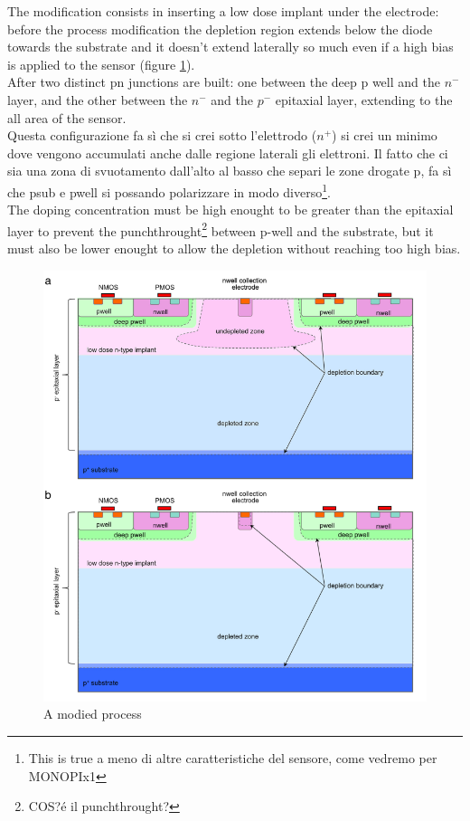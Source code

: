 The modification consists in inserting a low dose implant under the electrode: before the process modification the depletion region extends below the diode towards the substrate and it doesn't extend laterally so much even if a high bias is applied to the sensor (figure \ref{fig:modified_process}). \\
After two distinct pn junctions are built: one between the deep p well and the $n^-$ layer, and the other between the $n^-$ and the $p^-$ epitaxial layer, extending to the all area of the sensor.\\
Questa configurazione fa sì che si crei sotto l'elettrodo ($n^+$) si crei un minimo dove vengono 
accumulati anche dalle regione laterali gli elettroni. 
Il fatto che ci sia una zona di svuotamento dall'alto al basso che separi le zone drogate p, fa sì
che psub e pwell si possando polarizzare in modo diverso\footnote{This is true a meno di altre 
caratteristiche del sensore, come vedremo per MONOPIx1}.\\
The doping concentration must be high enought to be greater than the epitaxial layer to prevent the punchthrought\footnote{COS?é il punchthrought?} between p-well and the substrate, but it must also be lower enought to allow the depletion without reaching too high bias.
\begin{figure}
   \centering
   \includegraphics[width=.7\linewidth]{figures/modified_process.png}
   \caption{A modied process}
   \label{fig:modified_process}
\end{figure}



